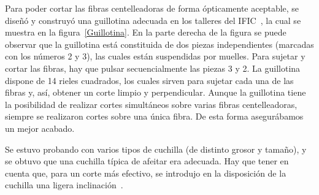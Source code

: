 Para poder cortar las fibras centelleadoras de forma ópticamente aceptable, se diseñó y construyó una guillotina adecuada en los talleres del IFIC~\cite{Alberto,anguloytiempo, dependencias, tesisfibras}, la cual se muestra en la figura~\ref{Guillotina}.
En la parte derecha  de la figura se puede observar que la guillotina está constituida de dos piezas independientes (marcadas con los números 2 y 3), las cuales están suspendidas por muelles. Para sujetar y cortar  las fibras, hay que pulsar  secuencialmente las piezas 3 y 2. 
La guillotina dispone de 14 rieles cuadrados, los cuales sirven para sujetar cada una de las fibras y, así, obtener un corte limpio y perpendicular. Aunque la guillotina tiene la posibilidad de realizar cortes simultáneos sobre varias fibras centelleadoras, siempre se realizaron cortes sobre una única fibra. De esta forma asegurábamos un mejor acabado.

Se estuvo probando con varios tipos de cuchilla (de distinto grosor y tamaño),  y se obtuvo que una cuchilla típica de afeitar era adecuada. Hay que tener en cuenta que, para un corte más efectivo, se introdujo en la disposición de la cuchilla una ligera inclinación~\cite{Alberto, anguloytiempo}. 

